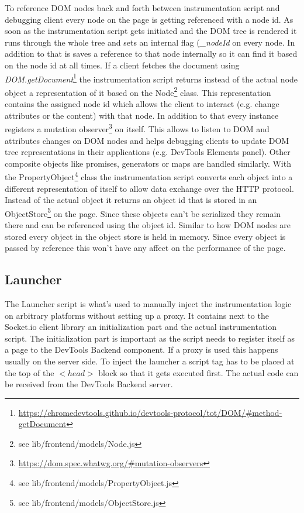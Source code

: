 To reference DOM nodes back and forth between instrumentation script and debugging client every node on
the page is getting referenced with a node id. As soon as the instrumentation script gets initiated and
the DOM tree is rendered it runs through the whole tree and sets an internal flag (\textit{\_nodeId} on
every node. In addition to that is saves a reference to that node internally so it can find it based
on the node id at all times. If a client fetches the document using \textit{DOM.getDocument}\footnote{\url{https://chromedevtools.github.io/devtools-protocol/tot/DOM/\#method-getDocument}}
the instrumentation script returns instead of the actual node object a representation of it based on
the Node\footnote{see lib/frontend/models/Node.js} class. This representation contains the assigned node
id which allows the client to interact (e.g. change attributes or the content) with that node. In addition
to that every instance registers a mutation observer\footnote{\url{https://dom.spec.whatwg.org/\#mutation-observers}}
on itself. This allows to listen to DOM and attributes changes on DOM nodes and helps debugging clients
to update DOM tree representations in their applications (e.g. DevTools Elements panel). Other composite
objects like promises, generators or maps are handled similarly. With the PropertyObject\footnote{see lib/frontend/models/PropertyObject.js}
class the instrumentation script converts each object into a different representation of itself to allow
data exchange over the HTTP protocol. Instead of the actual object it returns an object id that is stored
in an ObjectStore\footnote{see lib/frontend/models/ObjectStore.js} on the page. Since these objects can't
be serialized they remain there and can be referenced using the object id. Similar to how DOM nodes are
stored every object in the object store is held in memory. Since every object is passed by reference this
won't have any affect on the performance of the page.

\subsection{Launcher\label{sec:launcher}}

The Launcher script is what's used to manually inject the instrumentation logic on arbitrary platforms
without setting up a proxy. It contains next to the Socket.io client library an initialization part and
the actual instrumentation script. The initialization part is important as the script needs to register
itself as a page to the DevTools Backend component. If a proxy is used this happens usually on the server
side. To inject the launcher a script tag has to be placed at the top of the \textit{$<head>$} block so
that it gets executed first. The actual code can be received from the DevTools Backend server.

